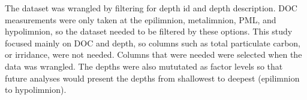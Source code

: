 \documentclass[12pt,]{article}
\newenvironment{Shaded}{\begin{snugshade}}{\end{snugshade}}
\newcommand{\KeywordTok}[1]{\textcolor[rgb]{0.13,0.29,0.53}{\textbf{#1}}}
\newcommand{\DataTypeTok}[1]{\textcolor[rgb]{0.13,0.29,0.53}{#1}}
\newcommand{\DecValTok}[1]{\textcolor[rgb]{0.00,0.00,0.81}{#1}}
\newcommand{\StringTok}[1]{\textcolor[rgb]{0.31,0.60,0.02}{#1}}
\newcommand{\CommentTok}[1]{\textcolor[rgb]{0.56,0.35,0.01}{\textit{#1}}}
\newcommand{\OtherTok}[1]{\textcolor[rgb]{0.56,0.35,0.01}{#1}}
\newcommand{\OperatorTok}[1]{\textcolor[rgb]{0.81,0.36,0.00}{\textbf{#1}}}
\newcommand{\NormalTok}[1]{#1}
\begin{document}
\begin{Shaded}
\end{Shaded}

The dataset was wrangled by filtering for depth id and depth
description. DOC measurements were only taken at the epilimnion,
metalimnion, PML, and hypolimnion, so the dataset needed to be filtered
by these options. This study focused mainly on DOC and depth, so columns
such as total particulate carbon, or irridance, were not needed. Columns
that were needed were selected when the data was wrangled. The depths
were also mututated as factor levels so that future analyses would
present the depths from shallowest to deepest (epilimnion to
hypolimnion).
\end{document}
